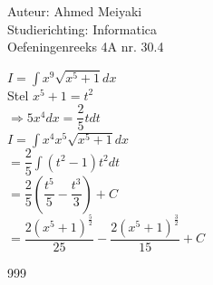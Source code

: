 \documentclass[a4paper]{article}
\begin{document}
  
\noindent \large Auteur: Ahmed Meiyaki \\
\noindent \large Studierichting: Informatica\\
\noindent \large Oefeningenreeks 4A nr. 30.4\\

\medskip

\normalsize

$I = \displaystyle\int x^9 \sqrt{x^5 + 1} dx $\\

Stel $x^5 + 1 = t^2 $\\

$\Rightarrow 5x^4dx = \dfrac{2}{5}tdt $\\

$ I = \displaystyle\int x^4 x^5 \sqrt{x^5 + 1} dx $\\

$= \dfrac{2}{5} \displaystyle\int \left(t^2 - 1\right)t^2 dt $\\

$= \dfrac{2}{5} \left(\dfrac{t^5}{5} - \dfrac{t^3}{3}\right) + C $\\

$= \dfrac{2\left(x^5 + 1\right)^{\tfrac{5}{2}}}{25} - \dfrac{2\left(x^5 + 1\right)^{\tfrac{3}{2}}}{15} + C $\\


\begin{thebibliography}{999}
\end{thebibliography}
\end{document}
